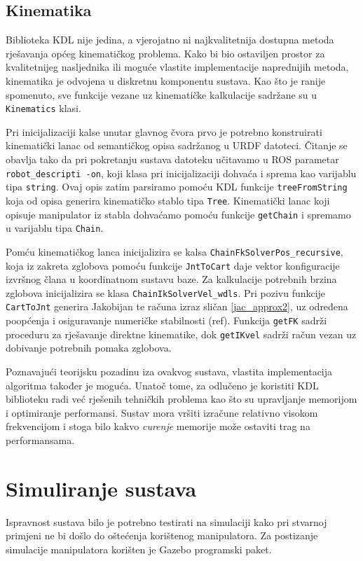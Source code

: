 \documentclass[times, utf8, diplomski, numeric]{fer}
\begin{document}
\subsection{Kinematika}
Biblioteka KDL nije jedina, a vjerojatno ni najkvalitetnija dostupna metoda rješavanja općeg kinematičkog problema.
Kako bi bio ostaviljen prostor za kvalitetnijeg nasljednika ili moguće vlastite implementacije naprednijih metoda, kinematika je odvojena u diskretnu komponentu sustava.
Kao što je ranije spomenuto, sve funkcije vezane uz kinematičke kalkulacije sadržane su u  \texttt{Kinematics} klasi.

Pri inicijalizaciji kalse unutar glavnog čvora prvo je potrebno konstruirati kinematički lanac od semantičkog opisa sadržanog u URDF datoteci.
Čitanje se obavlja tako da pri pokretanju sustava datoteku učitavamo u ROS parametar \texttt{robot\_descripti -on}, koji klasa pri inicijalizaciji dohvaća i sprema kao varijablu tipa \texttt{string}.
Ovaj opis zatim parsiramo pomoću KDL funkcije  \texttt{treeFromString} koja od opisa generira kinematičko stablo tipa \texttt{Tree}.
Kinematički lanac koji opisuje manipulator iz stabla dohvaćamo pomoću funkcije \texttt{getChain} i spremamo u varijablu tipa \texttt{Chain}.

Pomću kinematičkog lanca inicijalizira se kalsa \texttt{ChainFkSolverPos\_recur\-sive}, koja iz zakreta zglobova pomoću funkcije \texttt{JntToCart} daje vektor konfiguracije izvršnog člana u koordinatnom sustavu baze.
Za kalkulacije potrebnih brzina zglobova inicijalizira se klasa \texttt{ChainIkSolverVel\_wdls}.
Pri pozivu funkcije \texttt{CartToJnt} generira Jakobijan te računa izraz sličan \ref{jac_approx2}, uz određena poopćenja i osiguravanje numeričke stabilnosti (ref).
Funkcija \texttt{getFK} sadrži proceduru za rješavanje direktne kinematike, dok \texttt{getIKvel} sadrži račun vezan uz dobivanje potrebnih pomaka zglobova.

Poznavajući teorijsku pozadinu iza ovakvog sustava, vlastita implementacija algoritma također je moguća.
Unatoč tome, za odlučeno je koristiti KDL biblioteku radi već rješenih tehničkih problema kao što su upravljanje memorijom i optimiranje performansi.
Sustav mora vršiti izračune relativno visokom frekvencijom i stoga bilo kakvo \textit{curenje} memorije može ostaviti trag na performansama.

\section{Simuliranje sustava}\label{simuliranje}
Ispravnost sustava bilo je potrebno testirati na simulaciji kako pri stvarnoj primjeni ne bi došlo do oštećenja korištenog manipulatora.
Za postizanje simulacije manipulatora korišten je Gazebo programski paket.
\end{document}
